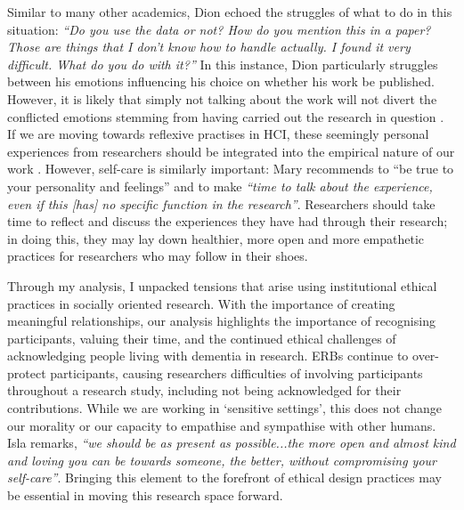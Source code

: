 Similar to many other academics, Dion echoed the struggles of what to do in this situation: \textit{“Do you use the data or not? How do you mention this in a paper? Those are things that I don’t know how to handle actually. I found it very difficult. What do you do with it?”} In this instance, Dion particularly struggles between his emotions influencing his choice on whether his work be published. However, it is likely that simply not talking about the work will not divert the conflicted emotions stemming from having carried out the research in question \citep{wacquant_for_2015}. If we are moving towards reflexive practises in HCI, these seemingly personal experiences from researchers should be integrated into the empirical nature of our work \citep{morrissey_value_2017}. However, self-care is similarly important: Mary recommends to “be true to your personality and feelings” and to make \textit{“time to talk about the experience, even if this [has] no specific function in the research”}. Researchers should take time to reflect and discuss the experiences they have had through their research; in doing this, they may lay down healthier, more open and more empathetic practices for researchers who may follow in their shoes.

Through my analysis, I unpacked tensions that arise using institutional ethical practices in socially oriented research. With the importance of creating meaningful relationships, our analysis highlights the importance of recognising participants, valuing their time, and the continued ethical challenges of acknowledging people living with dementia in research. ERBs continue to over-protect participants, causing researchers difficulties of involving participants throughout a research study, including not being acknowledged for their contributions. While we are working in ‘sensitive settings’, this does not change our morality or our capacity to empathise and sympathise with other humans. Isla remarks, \textit{“we should be as present as possible...the more open and almost kind and loving you can be towards someone, the better, without compromising your self-care”}. Bringing this element to the forefront of ethical design practices may be essential in moving this research space forward.

